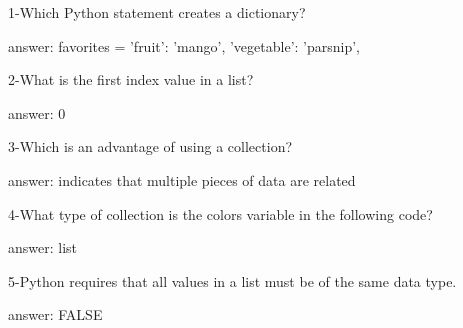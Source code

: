 1-Which Python statement creates a dictionary?


answer: favorites = {
  'fruit': 'mango',
  'vegetable': 'parsnip',
 }

2-What is the first index value in a list?


answer: 0


3-Which is an advantage of using a collection?

answer: indicates that multiple pieces of data are related

4-What type of collection is the colors variable in the following code?

answer: list

5-Python requires that all values in a list must be of the same data type.


answer: FALSE


